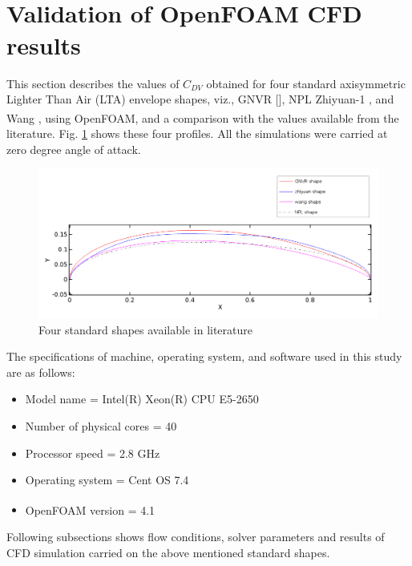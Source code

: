 \section{Validation of OpenFOAM\textsuperscript{\textregistered} CFD results}
\label{results}

This section describes the values of $C_{DV}$ obtained for four standard axisymmetric Lighter Than Air (LTA) envelope shapes, viz., GNVR [], NPL  Zhiyuan-1 , and Wang , using OpenFOAM\textsuperscript{\textregistered}, and a comparison with the values available from the literature. Fig. \ref{All profiles} shows these four profiles. All the simulations were carried at zero degree angle of attack.

\begin{figure}[H]
	\centering
	\includegraphics[width=400 pt]{rnd/all_profiles.png}
	\caption{Four standard shapes available in literature}
	\label{All profiles} 
\end{figure}
The specifications of machine, operating system, and software used in this study are as follows:
\begin{itemize}
	\item Model name = Intel(R) Xeon(R) CPU E5-2650
	\item Number of physical cores = 40
	\item Processor speed = 2.8 GHz
	\item Operating system = Cent OS 7.4
	\item OpenFOAM\textsuperscript{\textregistered} version = 4.1
\end{itemize}
Following subsections shows flow conditions, solver parameters and results of CFD simulation carried on the above mentioned standard shapes. 

